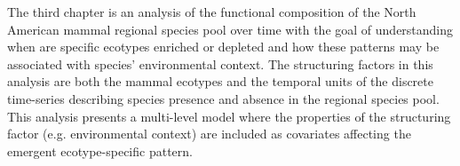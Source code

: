 The third chapter is an analysis of the functional composition of the North American mammal regional species pool over time with the goal of understanding when are specific ecotypes enriched or depleted and how these patterns may be associated with species' environmental context. The structuring factors in this analysis are both the mammal ecotypes and the temporal units of the discrete time-series describing species presence and absence in the regional species pool. This analysis presents a multi-level model where the properties of the structuring factor (e.g. environmental context) are included as covariates affecting the emergent ecotype-specific pattern. 





